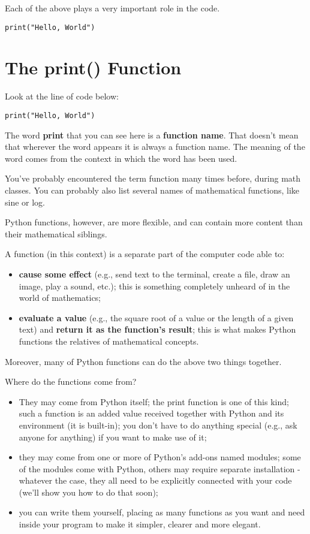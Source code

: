 \documentclass[a4paper,10pt]{article}
\begin{document}
Each of the above plays a very important role in the code.

\begin{verbatim}
print("Hello, World")
\end{verbatim}

\section{The print() Function}
Look at the line of code below:
\begin{verbatim}
print("Hello, World")
\end{verbatim}
The word \textbf{print} that you can see here is a \textbf{function name}. That doesn't mean that wherever the word appears it is always a function name. The meaning of the word comes from the context in which the word has been used.
\newline

You've probably encountered the term function many times before, during math classes. You can probably also list several names of mathematical functions, like sine or log.
\newline

Python functions, however, are more flexible, and can contain more content than their mathematical siblings.
\newline

A function (in this context) is a separate part of the computer code able to:
\begin{itemize}
 \item \textbf{cause some effect} (e.g., send text to the terminal, create a file, draw an image, play a sound, etc.); this is something completely unheard of in the world of mathematics;
 \item \textbf{evaluate a value} (e.g., the square root of a value or the length of a given text) and \textbf{return it as the function's result}; this is what makes Python functions the relatives of mathematical concepts.
\end{itemize}

Moreover, many of Python functions can do the above two things together.
\newline

Where do the functions come from?
\begin{itemize}
 \item They may come from Python itself; the print function is one of this kind; such a function is an added value received together with Python and its environment (it is built-in); you don't have to do anything special (e.g., ask anyone for anything) if you want to make use of it;
 \item they may come from one or more of Python's add-ons named modules; some of the modules come with Python, others may require separate installation - whatever the case, they all need to be explicitly connected with your code (we'll show you how to do that soon);
 \item you can write them yourself, placing as many functions as you want and need inside your program to make it simpler, clearer and more elegant.
\end{itemize}
\end{document}
